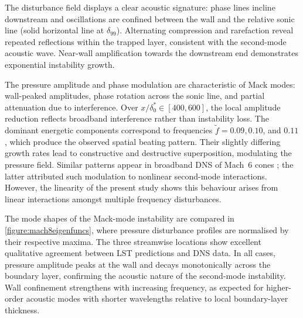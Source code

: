 The disturbance field displays a clear acoustic signature: phase lines incline downstream and oscillations are confined between the wall and the relative sonic line (solid horizontal line at $\delta_{99}$). Alternating compression and rarefaction reveal repeated reflections within the trapped layer, consistent with the second-mode acoustic wave. Near-wall amplification towards the downstream end demonstrates exponential instability growth.

The pressure amplitude and phase modulation are characteristic of Mack modes: wall-peaked amplitudes, phase rotation across the sonic line, and partial attenuation due to interference. Over $x/\delta^{*}_{0} \in [400, 600]$, the local amplitude reduction reflects broadband interference rather than instability loss. The dominant energetic components correspond to frequencies $\tilde{f} = 0.09, 0.10$, and $0.11$, which produce the observed spatial beating pattern. Their slightly differing growth rates lead to constructive and destructive superposition, modulating the pressure field. Similar patterns appear in broadband \gls{DNS} of Mach~6 cones \citep{SivasubramanianFasel2014,UnnikrishnanGaitonde2021}; the latter attributed such modulation to nonlinear second-mode interactions. However, the linearity of the present study shows this behaviour arises from linear interactions amongst multiple frequency disturbances.

The mode shapes of the Mack-mode instability are compared in \cref{figure:mach8eigenfuncs}, where pressure disturbance profiles are normalised by their respective maxima. The three streamwise locations show excellent qualitative agreement between \gls{LST} predictions and \gls{DNS} data. In all cases, pressure amplitude peaks at the wall and decays monotonically across the boundary layer, confirming the acoustic nature of the second-mode instability. Wall confinement strengthens with increasing frequency, as expected for higher-order acoustic modes with shorter wavelengths relative to local boundary-layer thickness.

